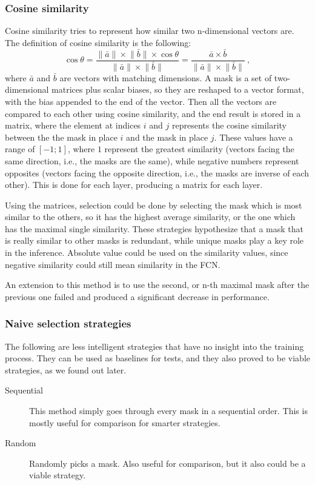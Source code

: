 \documentclass[12pt]{report}
\begin{document}
\subsubsection{Cosine similarity}Cosine similarity  tries to represent how similar two n-dimensional vectors are. The definition of cosine similarity is the following:
\begin{equation*}
\cos{\theta} = \dfrac{\lVert\bar{a}\rVert\times\lVert\bar{b}\rVert\times\cos{\theta}}{\lVert\bar{a}\rVert\times\lVert\bar{b}\rVert} = \dfrac{\bar{a}\times\bar{b}}{\lVert\bar{a}\rVert\times\lVert\bar{b}\rVert}\ ,
\end{equation*}
where $\bar{a}$ and $\bar{b}$ are vectors with matching dimensions. A mask is a set of two-dimensional matrices plus scalar biases, so they are reshaped to a vector format, with the bias appended to the end of the vector. Then all the vectors are compared to each other using cosine similarity, and the end result is stored in a matrix, where the element at indices $i$ and $j$ represents the cosine similarity between the the mask in place $i$ and the mask in place $j$. These values have a range of $\left[-1;1\right] $, where $1$ represent the greatest similarity (vectors facing the same direction, i.e., the masks are the same), while negative numbers represent opposites (vectors facing the opposite direction, i.e., the masks are inverse of each other). This is done for each layer, producing a matrix for each layer.

Using the matrices, selection could be done by selecting the mask which is most similar to the others, so it has the highest average similarity, or the one which has the maximal single similarity. These strategies hypothesize that a mask that is really similar to other masks is redundant, while unique masks play a key role in the inference. Absolute value could be used on the similarity values, since negative similarity could still mean similarity in the FCN.

An extension to this method is to use the second, or n-th maximal mask after the previous one failed and produced a significant decrease in performance.
\subsubsection{Naive selection strategies}
The following are less intelligent strategies that have no insight into the training process. They can be used as baselines for tests, and they also proved to be viable strategies, as we found out later.
\begin{description}
	\item[Sequential] This method simply goes through every mask in a sequential order. This is mostly useful for comparison for smarter strategies.
	\item[Random] Randomly picks a mask. Also useful for comparison, but it also could be a viable strategy.
\end{description}
\end{document}
